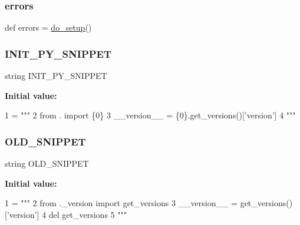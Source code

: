 \subsubsection{\texorpdfstring{errors}{errors}}
{\footnotesize\ttfamily def errors = \hyperlink{namespaceversioneer_a366c0b90d2355ed3559a4959cf1f2a82}{do\+\_\+setup}()}

\mbox{\label{namespaceversioneer_ac23efdab049f934e3547699a51d2b111}} 
\subsubsection{\texorpdfstring{I\+N\+I\+T\+\_\+\+P\+Y\+\_\+\+S\+N\+I\+P\+P\+ET}{INIT\_PY\_SNIPPET}}
{\footnotesize\ttfamily string I\+N\+I\+T\+\_\+\+P\+Y\+\_\+\+S\+N\+I\+P\+P\+ET}

{\bfseries Initial value\+:}
\begin{DoxyCode}
1 =  \textcolor{stringliteral}{"""}
2 \textcolor{stringliteral}{from . import \{0\}}
3 \textcolor{stringliteral}{\_\_version\_\_ = \{0\}.get\_versions()['version']}
4 \textcolor{stringliteral}{"""}
\end{DoxyCode}
\mbox{\label{namespaceversioneer_af52884d2628e1ddeba102845cd69c028}} 
\subsubsection{\texorpdfstring{O\+L\+D\+\_\+\+S\+N\+I\+P\+P\+ET}{OLD\_SNIPPET}}
{\footnotesize\ttfamily string O\+L\+D\+\_\+\+S\+N\+I\+P\+P\+ET}

{\bfseries Initial value\+:}
\begin{DoxyCode}
1 =  \textcolor{stringliteral}{"""}
2 \textcolor{stringliteral}{from .\_version import get\_versions}
3 \textcolor{stringliteral}{\_\_version\_\_ = get\_versions()['version']}
4 \textcolor{stringliteral}{del get\_versions}
5 \textcolor{stringliteral}{"""}
\end{DoxyCode}
\mbox{\label{namespaceversioneer_a33e79ab0016de06c2ffab10bc03b0750}} 
